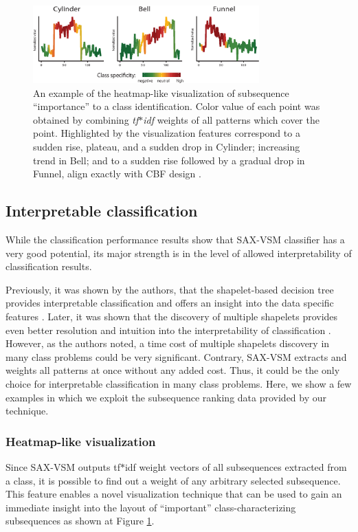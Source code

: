 \documentclass[conference]{IEEEtran}
\begin{document}
\begin{figure}[b]
   \centering
   \vspace{0.3cm}
   \includegraphics[width=87mm]{figures/CBF-HEAT.eps}
   \caption{An example of the heatmap-like visualization of subsequence ``importance''
   to a class identification. Color value of each point was obtained by combining 
   \textit{tf$\ast$idf} weights of all patterns which cover the point.
   Highlighted by the visualization features correspond to a sudden rise, plateau, 
   and a sudden drop in Cylinder; increasing trend in Bell; and to a sudden rise 
   followed by a gradual drop in Funnel, align exactly with CBF design \cite{cbf}.}
   \label{fig:heat}
   \vspace{-0.5cm}
\end{figure}

\subsection{Interpretable classification}
While the classification performance results show that SAX-VSM classifier has 
a very good potential, its major strength is in the level of allowed 
interpretability of classification results. 

Previously, it was shown by the authors, that the shapelet-based decision tree provides 
interpretable classification and offers an insight into the data specific features \cite{shapelet}. 
Later, it was shown that the discovery of multiple shapelets provides even 
better resolution and intuition into the interpretability of classification \cite{bagnal}. 
However, as the authors noted, a time cost of multiple shapelets discovery
in many class problems could be very significant. 
Contrary, SAX-VSM extracts and weights all patterns at once without
any added cost. Thus, it could be the only choice for interpretable classification 
in many class problems. 
Here, we show a few examples in which we exploit the subsequence ranking 
data provided by our technique.

\subsubsection{Heatmap-like visualization}
Since SAX-VSM outputs tf$\ast$idf weight vectors of all subsequences extracted from a
class, it is possible to find out a weight of any arbitrary selected subsequence.
This feature enables a novel visualization technique that can be used to gain an immediate
insight into the layout of ``important'' class-characterizing subsequences as shown at Figure
\ref{fig:heat}.
\end{document}
